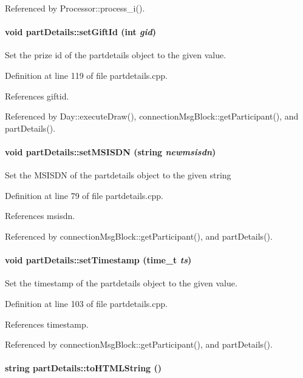 Referenced by Processor::process\_\-i().\hypertarget{classpartDetails_partDetailsa9}{
\paragraph[setGiftId]{\setlength{\rightskip}{0pt plus 5cm}void part\-Details::set\-Gift\-Id (int {\em gid})}\hfill}
\label{classpartDetails_partDetailsa9}


Set the prize id of the partdetails object to the given value. 

Definition at line 119 of file partdetails.cpp.

References giftid.

Referenced by Day::execute\-Draw(), connection\-Msg\-Block::get\-Participant(), and part\-Details().\hypertarget{classpartDetails_partDetailsa4}{
\paragraph[setMSISDN]{\setlength{\rightskip}{0pt plus 5cm}void part\-Details::set\-MSISDN (string {\em newmsisdn})}\hfill}
\label{classpartDetails_partDetailsa4}


Set the MSISDN of the partdetails object to the given string 

Definition at line 79 of file partdetails.cpp.

References msisdn.

Referenced by connection\-Msg\-Block::get\-Participant(), and part\-Details().\hypertarget{classpartDetails_partDetailsa7}{
\paragraph[setTimestamp]{\setlength{\rightskip}{0pt plus 5cm}void part\-Details::set\-Timestamp (time\_\-t {\em ts})}\hfill}
\label{classpartDetails_partDetailsa7}


Set the timestamp of the partdetails object to the given value. 

Definition at line 103 of file partdetails.cpp.

References timestamp.

Referenced by connection\-Msg\-Block::get\-Participant(), and part\-Details().\hypertarget{classpartDetails_partDetailsa13}{
\paragraph[toHTMLString]{\setlength{\rightskip}{0pt plus 5cm}string part\-Details::to\-HTMLString ()}\hfill}
\label{classpartDetails_partDetailsa13}


